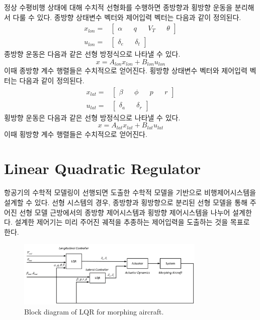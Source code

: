 \documentclass[a4paper, 12pt]{report}
\begin{document}
	정상 수평비행 상태에 대해 수치적 선형화를 수행하면 종방향과 횡방향 운동을 분리해서 다룰 수 있다.
	종방향 상태변수 벡터와 제어입력 벡터는 다음과 같이 정의된다.
	\begin{align}
		x_{lon} =& \begin{bmatrix}
			\alpha && q && V_T && \theta
		\end{bmatrix} \\
		u_{lon} =& \begin{bmatrix}
			\delta_e && \delta_t
		\end{bmatrix}
	\end{align}
	종방향 운동은 다음과 같은 선형 방정식으로 나타낼 수 있다.
	\begin{equation}
		x=A_{lon} x_{lon}+B_{lon} u_{lon}
	\end{equation}
	이때 종방향 계수 행렬들은 수치적으로 얻어진다.
	횡방향 상태변수 벡터와 제어입력 벡터는 다음과 같이 정의된다.
	\begin{align}
		x_{lat} =& \begin{bmatrix}
			\beta && \phi && p && r
		\end{bmatrix} \\
		u_{lat} =& \begin{bmatrix}
			\delta_a && \delta_r
		\end{bmatrix}
	\end{align}
	횡방향 운동은 다음과 같은 선형 방정식으로 나타낼 수 있다.
	\begin{equation}
		x=A_{lat} x_{lat}+B_{lat} u_{lat}
	\end{equation}
	이때 횡방향 계수 행렬들은 수치적으로 얻어진다.	
	
	\chapter{Linear Quadratic Regulator}
	
	항공기의 수학적 모델링이 선행되면 도출한 수학적 모델을 기반으로 비행제어시스템을 설계할 수 있다.
	선형 시스템의 경우, 종방향과 횡방향으로 분리된 선형 모델을 통해 주어진 선형 모델 근방에서의 종방향 제어시스템과 횡방향 제어시스템을 나누어 설계한다.
	설계한 제어기는 미리 주어진 궤적을 추종하는 제어입력을 도출하는 것을 목표로 한다.
	
	\begin{figure}[h]
		\centering
		\includegraphics[width=0.8\textwidth]{./resources/pdf/lqr.png}
		\caption{Block diagram of LQR for morphing aircraft.}
		\label{fig:lqr}
	\end{figure}
	
\end{document}
